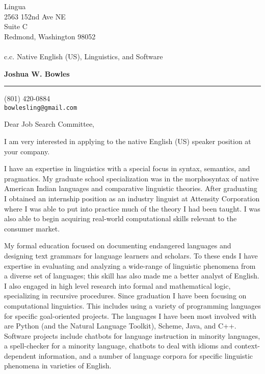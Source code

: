 \documentclass{letter} %
\begin{document}
\signature{Joshua W. Bowles}           %
\longindentation=0pt                       %
\let\raggedleft\raggedright                %
 
 
\begin{letter}{Lingua \\
2563 152nd Ave NE\\
Suite C\\
Redmond, Washington 98052\\
{}\quad\\
c.c. Native English (US), Linguistics, and Software}


\begin{flushleft}
{\large\bf Joshua W. Bowles}
\end{flushleft}
\medskip\hrule height 1pt
\begin{flushright}
\hfill (801) 420-0884\\ 
\hfill \texttt{bowlesling@gmail.com}\\ 
\end{flushright} 
\vfill %
 

\opening{Dear Job Search Committee,}
\noindent I am very interested in applying to the native English (US) speaker position at your company. 

\noindent I have an expertise in linguistics with a special focus in syntax, semantics, and pragmatics. My graduate school specialization was in the morphosyntax of native American Indian languages and comparative linguistic theories. After graduating I obtained an internship position as an industry linguist at Attensity Corporation where I was able to put into practice much of the theory I had been taught. I was also able to begin acquiring real-world computational skills relevant to the consumer market.   

\noindent My formal education focused on documenting endangered languages and designing text grammars for language learners and scholars. To these ends I have expertise in evaluating and analyzing a wide-range of linguistic phenomena from a diverse set of languages; this skill has also made me a better analyst of English. I also engaged in high level research into formal and mathematical logic, specializing in recursive procedures. Since graduation I have been focusing on computational linguistics. This includes using a variety of programming languages for specific goal-oriented projects. The languages I have been most involved with are Python (and the Natural Language Toolkit), Scheme, Java, and C++. Software projects include chatbots for language instruction in minority languages, a spell-checker for a minority language, chatbots to deal with idioms and context-dependent information, and a number of language corpora for specific linguistic phenomena in varieties of English.  


\end{letter}
\end{document}
